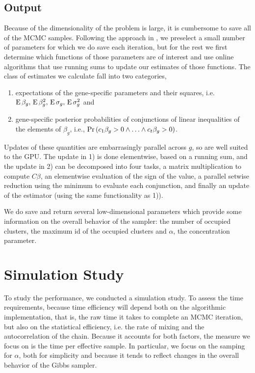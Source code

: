 

\subsection{Output}
\label{subsec:output}
Because of the dimensionality of the problem is large, it is cumbersome to save all of the MCMC samples. Following the approach in \citet{landau}, we preselect a small number of parameters for which we do save each iteration, but for the rest we first determine which functions of those parameters are of interest and use online algorithms that use running sums to update our estimates of those functions. The class of estimates we calculate fall into two categories,
\begin{enumerate}
\item expectations of the gene-specific parameters and their squares, i.e. $\operatorname{E} \beta_g,\, \operatorname{E} \beta_g^2,\, \operatorname{E}\sigma_g,\, \operatorname{E}\sigma_g^2$ and 
\item gene-specific posterior probabilities of conjunctions of linear
  inequalities of the elements of $\beta_g$, i.e.,
  $\operatorname{Pr}\left(c_1\beta_g > 0 \land \ldots \land c_t\beta_g > 0\right)$.
\end{enumerate}
Updates of these quantities are embarrasingly parallel across $g$, so are well suited to the GPU. The update in 1) is done elementwise, based on a running sum, and the update in 2) can be decomposed into four tasks, a matrix multiplication to compute $C\beta$, an elementwise evaluation of the sign of the value, a parallel setwise reduction using the minimum to evaluate each conjunction, and finally an update of the estimator (using the same functionality as 1)).

We do save and return several low-dimensional parameters which provide some information on the overall behavior of the sampler: the number of occupied clusters, the maximum id of the occupied clusters and $\alpha$, the concentration parameter.


\section{Simulation Study}
\label{sec:timing}
To study the performance, we conducted a simulation study. To assess the time requirements, because time efficiency will depend both on the algorithmic implementation, that is, the raw time it takes to complete an MCMC iteration, but also on the statistical efficiency, i.e. the rate of mixing and the autocorrelation of the chain. Because it accounts for both factors, the measure we focus on is the time per effective sample. In particular, we focus on the samping for $\alpha$, both for simplicity and because it tends to reflect changes in the overall behavior of the Gibbs sampler.

